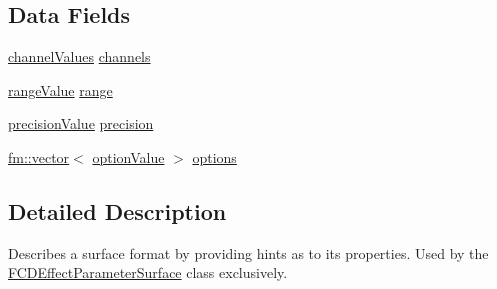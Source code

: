 \subsection*{Data Fields}
\begin{DoxyCompactItemize}
\item 
\hyperlink{structFCDFormatHint_a4c22503ef75be12aa19a582b88ce32c1}{channelValues} \hyperlink{structFCDFormatHint_acfb2c3d8e09bcb65430d2d733ee2023c}{channels}
\item 
\hyperlink{structFCDFormatHint_a28f1ee9691301b71d657b472689d77a9}{rangeValue} \hyperlink{structFCDFormatHint_ab999301788a29244f9b81e9dd6fe4277}{range}
\item 
\hyperlink{structFCDFormatHint_a720a2fffc66e38ba997c263e22ddc2c2}{precisionValue} \hyperlink{structFCDFormatHint_ab9648a25aadd4c375d3b574f3c980d74}{precision}
\item 
\hyperlink{classfm_1_1vector}{fm::vector}$<$ \hyperlink{structFCDFormatHint_a4777b8826090e9f6c9812711faf3ac66}{optionValue} $>$ \hyperlink{structFCDFormatHint_aaa86d7af04b996fb90c551b2d401a0be}{options}
\end{DoxyCompactItemize}


\subsection{Detailed Description}
Describes a surface format by providing hints as to its properties. Used by the \hyperlink{classFCDEffectParameterSurface}{FCDEffectParameterSurface} class exclusively. 

